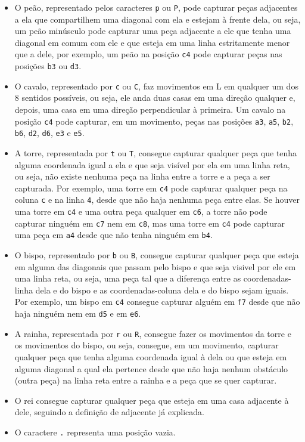 \begin{itemize}
    \item O peão, representado pelos caracteres \texttt{p} ou \texttt{P}, pode capturar peças adjacentes a ela que compartilhem uma diagonal com ela e estejam à frente dela, ou seja, um peão minúsculo pode capturar uma peça adjacente a ele que tenha uma diagonal em comum com ele e que esteja em uma linha estritamente menor que a dele, por exemplo, um peão na posição \texttt{c4} pode capturar peças nas posições \texttt{b3} ou \texttt{d3}.
    \item O cavalo, representado por \texttt{c} ou \texttt{C}, faz movimentos em L em qualquer um dos 8 sentidos possíveis, ou seja, ele anda duas casas em uma direção qualquer e, depois, uma casa em uma direção perpendicular à primeira. Um cavalo na posição \texttt{c4} pode capturar, em um movimento, peças nas posições \texttt{a3}, \texttt{a5}, \texttt{b2}, \texttt{b6}, \texttt{d2}, \texttt{d6}, \texttt{e3} e \texttt{e5}.
    \item A torre, representada por \texttt{t} ou \texttt{T}, consegue capturar qualquer peça que tenha alguma coordenada igual a ela e que seja visível por ela em uma linha reta, ou seja, não existe nenhuma peça na linha entre a torre e a peça a ser capturada. Por exemplo, uma torre em \texttt{c4} pode capturar qualquer peça na coluna \texttt{c} e na linha \texttt{4}, desde que não haja nenhuma peça entre elas. Se houver uma torre em \texttt{c4} e uma outra peça qualquer em \texttt{c6}, a torre não pode capturar ninguém em \texttt{c7} nem em \texttt{c8}, mas uma torre em \texttt{c4} pode capturar uma peça em \texttt{a4} desde que não tenha ninguém em \texttt{b4}.
    \item O bispo, representado por \texttt{b} ou \texttt{B}, consegue capturar qualquer peça que esteja em alguma das diagonais que passam pelo bispo e que seja visivel por ele em uma linha reta, ou seja, uma peça tal que a diferença entre as coordenadas-linha dela e do bispo e as coordenadas-coluna dela e do bispo sejam iguais. Por exemplo, um bispo em \texttt{c4} consegue capturar alguém em \texttt{f7} desde que não haja ninguém nem em \texttt{d5} e em \texttt{e6}.
    \item A rainha, representada por \texttt{r} ou \texttt{R}, consegue fazer os movimentos da torre e os movimentos do bispo, ou seja, consegue, em um movimento, capturar qualquer peça que tenha alguma coordenada igual à dela ou que esteja em alguma diagonal a qual ela pertence desde que não haja nenhum obstáculo (outra peça) na linha reta entre a rainha e a peça que se quer capturar.
    \item O rei consegue capturar qualquer peça que esteja em uma casa adjacente à dele, seguindo a definição de adjacente já explicada.
    \item O caractere \texttt{.} representa uma posição vazia.
\end{itemize}
